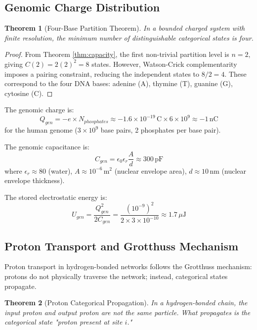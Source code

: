 \documentclass[12pt,a4paper]{article}
\newtheorem{theorem}{Theorem}[section]
\begin{document}
\subsection{Genomic Charge Distribution}

\begin{theorem}[Four-Base Partition Theorem]
\label{thm:fourbases}
In a bounded charged system with finite resolution, the minimum number of distinguishable categorical states is four.
\end{theorem}

\begin{proof}
From Theorem \ref{thm:capacity}, the first non-trivial partition level is $n=2$, giving $C(2) = 2(2)^2 = 8$ states. However, Watson-Crick complementarity imposes a pairing constraint, reducing the independent states to $8/2 = 4$. These correspond to the four DNA bases: adenine (A), thymine (T), guanine (G), cytosine (C).
\end{proof}

The genomic charge is:
\begin{equation}
Q_{gen} = -e \times N_{phosphates} \approx -1.6 \times 10^{-19} \, \text{C} \times 6 \times 10^9 \approx -1 \, \text{nC}
\end{equation}
for the human genome ($3 \times 10^9$ base pairs, 2 phosphates per base pair).

The genomic capacitance is:
\begin{equation}
C_{gen} = \epsilon_0 \epsilon_r \frac{A}{d} \approx 300 \, \text{pF}
\end{equation}
where $\epsilon_r \approx 80$ (water), $A \approx 10^{-6} \, \text{m}^2$ (nuclear envelope area), $d \approx 10 \, \text{nm}$ (nuclear envelope thickness).

The stored electrostatic energy is:
\begin{equation}
U_{gen} = \frac{Q_{gen}^2}{2C_{gen}} = \frac{(10^{-9})^2}{2 \times 3 \times 10^{-10}} \approx 1.7 \, \mu\text{J}
\end{equation}

\subsection{Proton Transport and Grotthuss Mechanism}

Proton transport in hydrogen-bonded networks follows the Grotthuss mechanism: protons do not physically traverse the network; instead, categorical states propagate.

\begin{theorem}[Proton Categorical Propagation]
In a hydrogen-bonded chain, the input proton and output proton are not the same particle. What propagates is the categorical state "proton present at site $i$."
\end{theorem}
\end{document}
